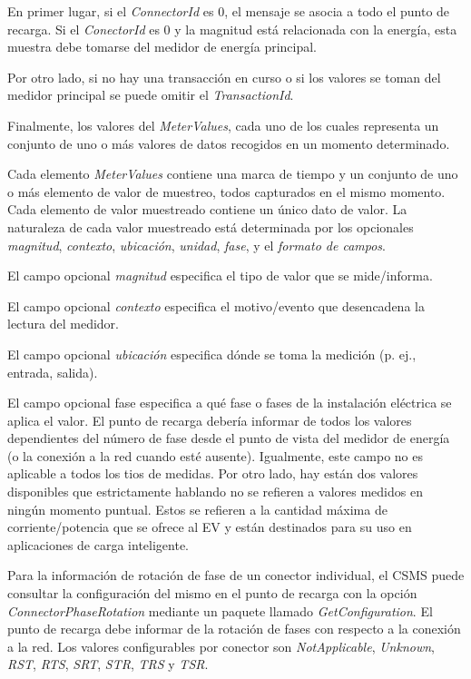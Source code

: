 \documentclass[12pt,a4paper,onecolumn,oneside]{report}
\begin{document}
En primer lugar, si el \textit{ConnectorId} es 0, el mensaje se asocia a todo el punto de recarga. Si el \textit{ConectorId} es 0 y la magnitud está relacionada con la energía, esta muestra debe tomarse del medidor de energía principal.

Por otro lado, si no hay una transacción en curso o si los valores se toman del medidor principal se puede omitir el \textit{TransactionId}. 

Finalmente, los valores del \textit{MeterValues}, cada uno de los cuales representa un conjunto de uno o más valores de datos recogidos en un momento determinado.

Cada elemento \textit{MeterValues} contiene una marca de tiempo y un conjunto de uno o más elemento de valor de muestreo, todos capturados en el mismo momento. Cada elemento de valor muestreado contiene un único dato de valor. La naturaleza de cada valor muestreado está determinada por los opcionales \textit{magnitud}, \textit{contexto}, \textit{ubicación}, \textit{unidad}, \textit{fase}, y el \textit{formato de campos}.

El campo opcional \textit{magnitud} especifica el tipo de valor que se mide/informa.

El campo opcional \textit{contexto} especifica el motivo/evento que desencadena la lectura del medidor.

El campo opcional \textit{ubicación} especifica dónde se toma la medición (p. ej., entrada, salida).

El campo opcional fase especifica a qué fase o fases de la instalación eléctrica se aplica el valor. El punto de recarga debería informar de todos los valores dependientes del número de fase desde el punto de vista del medidor de energía (o la conexión a la red cuando esté ausente). Igualmente, este campo no es aplicable a todos los tios de medidas. Por otro lado, hay están dos valores disponibles que estrictamente hablando no se refieren a valores medidos en ningún momento puntual. Estos se refieren a la cantidad máxima de corriente/potencia que se ofrece al EV y están destinados para su uso en aplicaciones de carga inteligente.

Para la información de rotación de fase de un conector individual, el CSMS puede consultar la configuración del mismo en el punto de recarga con la opción \textit{ConnectorPhaseRotation} mediante un paquete llamado \textit{GetConfiguration}. El punto de recarga debe informar de la rotación de fases con respecto a la conexión a la red. Los valores configurables por conector son \textit{NotApplicable}, \textit{Unknown}, \textit{RST}, \textit{RTS}, \textit{SRT}, \textit{STR}, \textit{TRS} y \textit{TSR}. 
\end{document}
